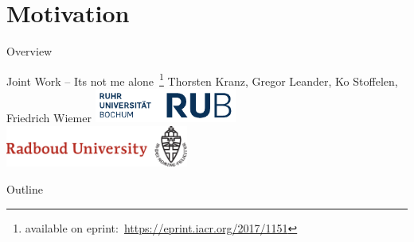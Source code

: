 \section{Motivation}
\begin{frame}{Overview}{}
    \begin{block}{Joint Work -- Its not me alone~\cite{ToSC:KLSW17}\footnote{available on eprint:~\url{https://eprint.iacr.org/2017/1151}}}
        \centering
        Thorsten Kranz, Gregor Leander, Ko Stoffelen, Friedrich Wiemer
        \includegraphics[width=0.35\textwidth]{data/logo_rub}
        \hspace{2em}
        \includegraphics[width=0.45\textwidth]{data/ru_en_branding}
    \end{block}
    \begin{block}{Outline}
        \vspace{0.5em}
        \tableofcontents
    \end{block}
\end{frame}

